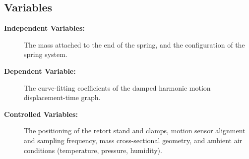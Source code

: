 \subsection{Variables}
\begin{description}
    \item[{\small\bfseries Independent Variables:}] The mass attached to the end of the spring, and the configuration of the spring system.
    \item[{\small\bfseries Dependent Variable:}] The curve-fitting coefficients of the damped harmonic motion displacement-time graph.
    \item[{\small\bfseries Controlled Variables:}] The positioning of the retort stand and clamps, motion sensor alignment and sampling frequency, mass cross-sectional geometry, and ambient air conditions (temperature, pressure, humidity).
\end{description}